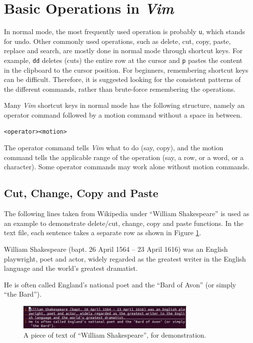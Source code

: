 \section{Basic Operations in \textit{Vim}}

In normal mode, the most frequently used operation is probably \verb|u|, which stands for undo. Other commonly used operations, such as delete, cut, copy, paste, replace and search, are mostly done in normal mode through shortcut keys. For example, \verb|dd| deletes (cuts) the entire row at the cursor and \verb|p| pastes the content in the clipboard to the cursor position. For beginners, remembering shortcut keys can be difficult. Therefore, it is suggested looking for the consistent patterns of the different commands, rather than brute-force remembering the operations.

Many \textit{Vim} shortcut keys in normal mode has the following structure, namely an operator command followed by a motion command without a space in between.
\begin{lstlisting}
<operator><motion>
\end{lstlisting}
The operator command tells \textit{Vim} what to do (say, copy), and the motion command tells the applicable range of the operation (say, a row, or a word, or a character). Some operator commands may work alone without motion commands.

\subsection{Cut, Change, Copy and Paste}

The following lines taken from Wikipedia under ``William Shakespeare'' is used as an example to demonstrate delete/cut, change, copy and paste functions. In the text file, each sentence takes a separate row as shown in Figure \ref{ch:tfe:fig:vimdemo1}.

\begin{shortbox}
William Shakespeare (bapt. 26 April 1564 – 23 April 1616) was an English playwright, poet and actor, widely regarded as the greatest writer in the English language and the world's greatest dramatist.

He is often called England's national poet and the ``Bard of Avon'' (or simply ``the Bard'').
\end{shortbox}

\begin{figure}[htbp]
\centering
\includegraphics[width=250pt]{chapters/part-1/figures/vimdemo1.png}
\caption{A piece of text of ``William Shakespeare'', for demonstration.} \label{ch:tfe:fig:vimdemo1}
\end{figure}

